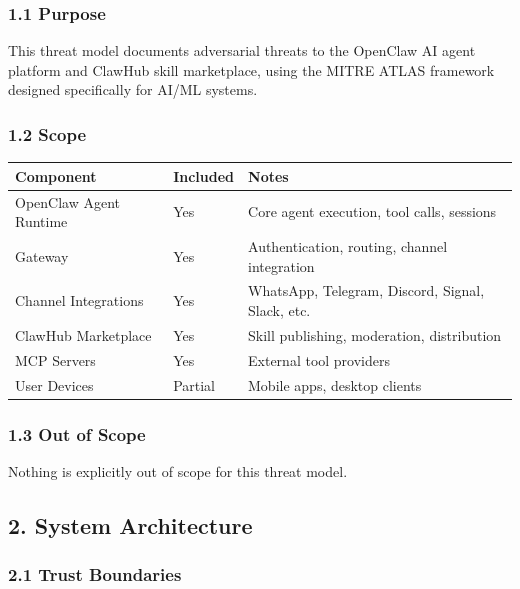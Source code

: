 \subsubsection{1.1 Purpose}


This threat model documents adversarial threats to the OpenClaw AI agent platform and ClawHub skill marketplace, using the MITRE ATLAS framework designed specifically for AI/ML systems.

\subsubsection{1.2 Scope}



\begin{table}[h]
\centering
\small
\begin{tabular}{|l|l|l|}
\hline
Component & Included & Notes \\
\hline
OpenClaw Agent Runtime & Yes & Core agent execution, tool calls, sessions \\
\hline
Gateway & Yes & Authentication, routing, channel integration \\
\hline
Channel Integrations & Yes & WhatsApp, Telegram, Discord, Signal, Slack, etc. \\
\hline
ClawHub Marketplace & Yes & Skill publishing, moderation, distribution \\
\hline
MCP Servers & Yes & External tool providers \\
\hline
User Devices & Partial & Mobile apps, desktop clients \\
\hline
\end{tabular}
\end{table}



\subsubsection{1.3 Out of Scope}


Nothing is explicitly out of scope for this threat model.

\hrulefill


\subsection{2. System Architecture}


\subsubsection{2.1 Trust Boundaries}


